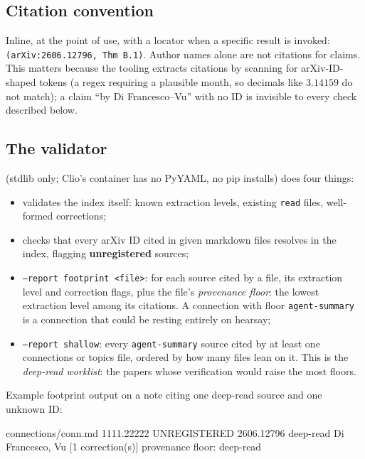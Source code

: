 \documentclass[11pt,a4paper]{article}
\newcommand{\level}[1]{\texttt{#1}}
\begin{document}
\subsection{Citation convention}

Inline, at the point of use, with a locator when a specific result is
invoked: \texttt{(arXiv:2606.12796, Thm B.1)}. Author names alone are not
citations for claims. This matters because the tooling extracts citations by
scanning for arXiv-ID-shaped tokens (a regex requiring a plausible month,
so decimals like $3.14159$ do not match); a claim ``by Di Francesco--Vu''
with no ID is invisible to every check described below.

\subsection{The validator}

 (stdlib only; Clio's container has no PyYAML,
no pip installs) does four things:

\begin{itemize}[nosep]
  \item validates the index itself: known extraction levels, existing
    \texttt{read} files, well-formed corrections;
  \item checks that every arXiv ID cited in given markdown files resolves in
    the index, flagging \textbf{unregistered} sources;
  \item \texttt{--report footprint <file>}: for each source cited by a file,
    its extraction level and correction flags, plus the file's
    \emph{provenance floor}: the lowest extraction level among its
    citations. A connection with floor \level{agent-summary} is a connection
    that could be resting entirely on hearsay;
  \item \texttt{--report shallow}: every \level{agent-summary} source cited
    by at least one connections or topics file, ordered by how many files
    lean on it. This is the \emph{deep-read worklist}: the papers whose
    verification would raise the most floors.
\end{itemize}

Example footprint output on a note citing one deep-read source and one
unknown ID:

\begin{code}
connections/conn.md
  1111.22222  UNREGISTERED
  2606.12796  deep-read      Di Francesco, Vu  [1 correction(s)]
  provenance floor: deep-read
\end{code}
\end{document}
